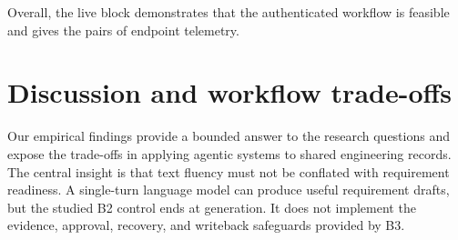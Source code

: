 \documentclass[pdflatex,sn-basic]{sn-jnl}
\begin{document}
Overall, the live block demonstrates that the authenticated workflow is feasible and gives the pairs of endpoint telemetry.

\FloatBarrier
\section{Discussion and workflow trade-offs}\label{sec:discussion}
Our empirical findings provide a bounded answer to the research questions and expose the trade-offs in applying agentic systems to shared engineering records. The central insight is that text fluency must not be conflated with requirement readiness. A single-turn language model can produce useful requirement drafts, but the studied B2 control ends at generation. It does not implement the evidence, approval, recovery, and writeback safeguards provided by B3.
\end{document}
